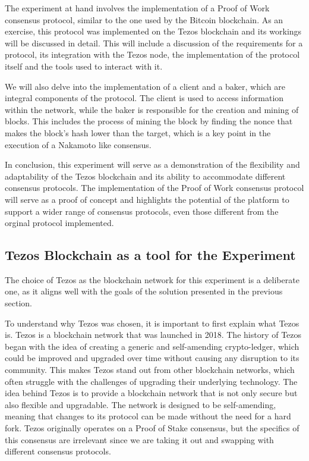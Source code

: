 The experiment at hand involves the implementation of a Proof of Work consensus protocol, similar to the one used by the Bitcoin blockchain.
As an exercise, this protocol was implemented on the Tezos blockchain and its workings will be discussed in detail. This will include a discussion of the requirements for a protocol, its integration with the Tezos node, the implementation of the protocol itself and the tools used to interact with it.

We will also delve into the implementation of a client and a baker, which are integral components of the protocol. The client is used to access information within the network, while the baker is responsible for the creation and mining of blocks. This includes the process of mining the block by finding the nonce that makes the block's hash lower than the target, which is a key point in the execution of a Nakamoto like consensus.

In conclusion, this experiment will serve as a demonstration of the flexibility and adaptability of the Tezos blockchain and its ability to accommodate different consensus protocols. The implementation of the Proof of Work consensus protocol will serve as a proof of concept and highlights the potential of the platform to support a wider range of consensus protocols, even those different from the orginal protocol implemented.

\subsection*{\textbf{Tezos Blockchain as a tool for the Experiment}}
The choice of Tezos as the blockchain network for this experiment is a deliberate one, as it aligns well with the goals of the solution presented in the previous section.

To understand why Tezos was chosen, it is important to first explain what Tezos is. Tezos is a blockchain network that was launched in 2018. The history of Tezos began with the idea of creating a generic and self-amending crypto-ledger, which could be improved and upgraded over time without causing any disruption to its community. This makes Tezos stand out from other blockchain networks, which often struggle with the challenges of upgrading their underlying technology. The idea behind Tezos is to provide a blockchain network that is not only secure but also flexible and upgradable. The network is designed to be self-amending, meaning that changes to its protocol can be made without the need for a hard fork. Tezos originally operates on a Proof of Stake consensus, but the specifics of this consensus are irrelevant since we are taking it out and swapping with different consensus protocols.


